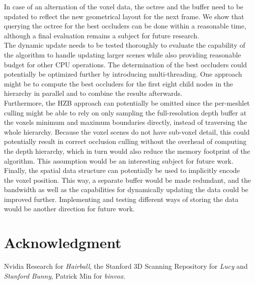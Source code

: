 \documentclass[conference]{IEEEtran}
\begin{document}
\noindent   %
In case of an alternation of the voxel data, the octree and the buffer need to be updated to reflect the 
new geometrical layout for the next frame. We show that querying the octree for the best occluders can be done 
within a reasonable time, although a final evaluation remains a subject for future research. \\

\noindent
The dynamic update needs to be tested thoroughly to evaluate the capability of the algorithm to handle updating 
larger scenes while also providing reasonable budget for other \ac{CPU} operations. The determination of the best 
occluders could potentially be optimized further by introducing multi-threading. One approach might be to 
compute the best occluders for the first eight child nodes in the hierarchy in parallel and to combine the results 
afterwards. \\

\noindent
Furthermore, the \ac{HZB} approach can potentially be omitted since the per-meshlet culling might be able to 
rely on only sampling the full-resolution depth buffer at the voxels minimum and maximum boundaries directly, 
instead of traversing the whole hierarchy. Because the voxel scenes do not have sub-voxel detail, this could 
potentially result in correct occlusion culling without the overhead of computing the depth hierarchy, which 
in turn would also reduce the memory footprint of the algorithm. This assumption would be an interesting 
subject for future work. \\

\noindent
Finally, the spatial data structure can potentially be used to implicitly encode the voxel position. This way, 
a separate buffer would be made redundant, and the bandwidth as well as the capabilities for dynamically updating the 
data could be improved further. Implementing and testing different ways of storing the data would be another 
direction for future work.

\section*{Acknowledgment} \label{section-acknowledgment}

\noindent
Nvidia Research for \emph{Hairball}, the Stanford 3D Scanning Repository for \emph{Lucy} 
and \emph{Stanford Bunny}, Patrick Min for \emph{binvox}.
\end{document}
